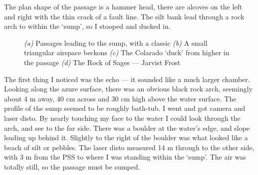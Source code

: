 The plan shape of the passage is a hammer head, there are alcoves on the left and right with the thin crack of a fault line. The silt bank lead through a rock arch to within the `sump', so I stooped and ducked in.
\begin{figure}[t]
\checkoddpage \ifoddpage \forcerectofloat \else \forceversofloat \fi
    \centering
    \begin{subfigure}[t]{0.345\textwidth}
    \centering
        \caption{} \label{Hourglass passage}
    \end{subfigure}
        \hfill
        \begin{subfigure}[t]{0.615\textwidth}
        \centering
        \caption{} \label{Colorado Duck}
    \end{subfigure}
          \vspace{0cm}
          
    \begin{subfigure}[t]{0.615\textwidth}
        \centering
        \caption{} \label{Colarado Sump}
    \end{subfigure}
    \hfill
    \begin{subfigure}[t]{0.345\textwidth}
\centering
{}
\label{Rock of Sages}
\end{subfigure}
    \caption{
    \textit{(a)} Passages leading to the sump, with a classic  
    \textit{(b)} A small triangular airspace beckons
    \textit{(c)}  The Colarado `duck' from higher in the passage
    \textit{(d)} The Rock of Sages --- Jarvist Frost}
\end{figure}

The first thing I noticed was the echo --- it sounded like a much larger chamber. Looking along the azure surface, there was an obvious black rock arch, seemingly about 4 m away, 40 cm across and 30 cm high above the water surface. The profile of the sump seemed to be roughly bath-tub.
I went and got camera and laser disto. By nearly touching my face to the water I could look through the arch, and see to the far side. There was a boulder at the water's edge, and slope leading up behind it. Slightly to the right of the boulder was what looked like a beach of silt or pebbles. The laser disto measured 14 m through to the other side, with 3 m from the PSS to where I was standing within the `sump'. The air was totally still, so the passage must be sumped.

